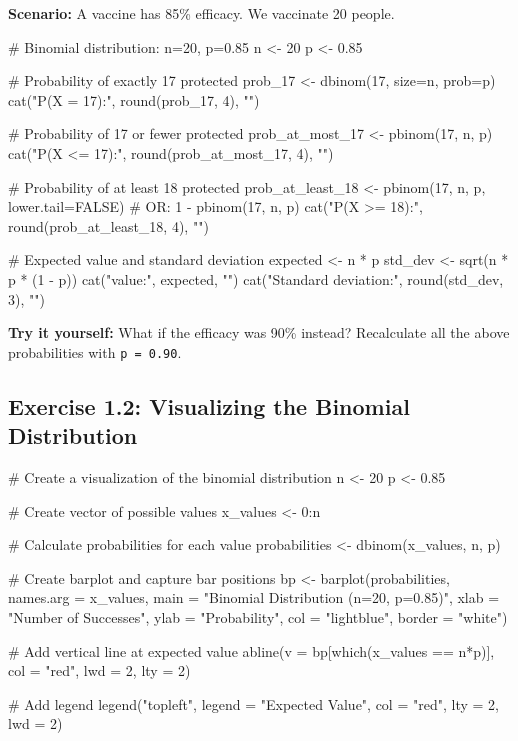 \documentclass[11pt]{article}
\begin{document}
\textbf{Scenario:} A vaccine has 85\% efficacy. We vaccinate 20 people.

\begin{rcode}
# Binomial distribution: n=20, p=0.85
n <- 20
p <- 0.85

# Probability of exactly 17 protected
prob_17 <- dbinom(17, size=n, prob=p)
cat("P(X = 17):", round(prob_17, 4), "\n")

# Probability of 17 or fewer protected
prob_at_most_17 <- pbinom(17, n, p)
cat("P(X <= 17):", round(prob_at_most_17, 4), "\n")

# Probability of at least 18 protected
prob_at_least_18 <- pbinom(17, n, p, lower.tail=FALSE)
# OR: 1 - pbinom(17, n, p)
cat("P(X >= 18):", round(prob_at_least_18, 4), "\n")

# Expected value and standard deviation
expected <- n * p
std_dev <- sqrt(n * p * (1 - p))
cat("\nExpected value:", expected, "\n")
cat("Standard deviation:", round(std_dev, 3), "\n")
\end{rcode}

\textbf{Try it yourself:} What if the efficacy was 90\% instead? Recalculate all the above probabilities with \texttt{p = 0.90}.

\vspace{2cm}

\subsection{Exercise 1.2: Visualizing the Binomial Distribution}

\begin{rcode}
# Create a visualization of the binomial distribution
n <- 20
p <- 0.85

# Create vector of possible values
x_values <- 0:n

# Calculate probabilities for each value
probabilities <- dbinom(x_values, n, p)

# Create barplot and capture bar positions
bp <- barplot(probabilities,
              names.arg = x_values,
              main = "Binomial Distribution (n=20, p=0.85)",
              xlab = "Number of Successes",
              ylab = "Probability",
              col = "lightblue",
              border = "white")

# Add vertical line at expected value
abline(v = bp[which(x_values == n*p)], col = "red", lwd = 2, lty = 2)

# Add legend
legend("topleft",
       legend = "Expected Value",
       col = "red",
       lty = 2,
       lwd = 2)
\end{rcode}
\end{document}
